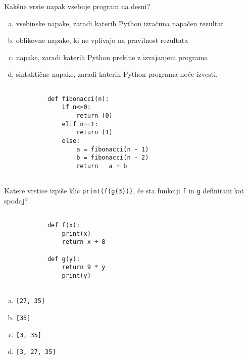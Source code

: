 \documentclass[arhiv, 10pt]{../izpit}
\newcommand{\inlinepy}[1]{\texttt{#1}}
\begin{document}
        \naloga*
        \begin{multicols}{2}
        \noindent
        Kakšne vrste napak vsebuje program na desni?

        \begin{enumerate}[(a)]
\item vsebinske napake, zaradi katerih Python izračuna napačen rezultat
\item oblikovne napake, ki ne vplivajo na pravilnost rezultata
\item napake, zaradi katerih Python prekine z izvajanjem programa
\item sintaktične napake, zaradi katerih Python programa noče izvesti.
\end{enumerate}

        \columnbreak

        \begin{verbatim}
        
            def fibonacci(n):
                if n<=0:
                    return (0)
                elif n==1:
                    return (1)
                else:
                    a = fibonacci(n - 1)
                    b = fibonacci(n - 2)
                    return   a + b
            
        \end{verbatim}

        \end{multicols}

    
        \naloga*
        Katere vrstice izpiše klic \inlinepy{print(f(g(3)))}, če sta funkciji \inlinepy{f} in \inlinepy{g} definirani kot spodaj?

        \begin{multicols}{2}
        \begin{verbatim}
        
            def f(x):
                print(x)
                return x + 8

            def g(y):
                return 9 * y
                print(y)
        
        \end{verbatim}

        \begin{enumerate}[(a)]
\item \inlinepy{[27, 35]}
\item \inlinepy{[35]}
\item \inlinepy{[3, 35]}
\item \inlinepy{[3, 27, 35]}
\end{enumerate}

        \end{multicols}
    
\end{document}
